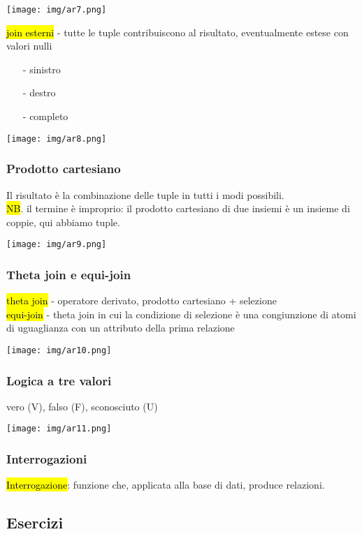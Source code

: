 \documentclass[a4paper]{article}
\begin{document}
\begin{center}
      \texttt{[image: img/ar7.png]}
\end{center}\par \hl{join esterni} - tutte le tuple contribuiscono al risultato, eventualmente estese con valori nulli
\begin{itemize}[noitemsep]
  \item [-] sinistro
  \item [-] destro
  \item [-] completo
\end{itemize}
\begin{center}
      \texttt{[image: img/ar8.png]}
\end{center}\par \subsubsection{Prodotto cartesiano}
Il risultato è la combinazione delle tuple in tutti i modi possibili.\\
\hl{NB}. il termine è improprio: il prodotto cartesiano di due insiemi è un insieme di coppie, qui abbiamo tuple.
\begin{center}
      \texttt{[image: img/ar9.png]}
\end{center}\par \subsubsection{Theta join e equi-join}
\hl{theta join} - operatore derivato, prodotto cartesiano + selezione\medskip\\
\hl{equi-join} - theta join in cui la condizione di selezione è una congiunzione di atomi di uguaglianza con un attributo della prima relazione
\begin{center}
      \texttt{[image: img/ar10.png]}
\end{center}\par \subsubsection{Logica a tre valori}
vero (V), falso (F), sconosciuto (U)
\begin{center}
      \texttt{[image: img/ar11.png]}
\end{center}\par \subsubsection{Interrogazioni}
\hl{Interrogazione}: funzione che, applicata alla base di dati, produce relazioni.\par \subsection{Esercizi}
\end{document}
